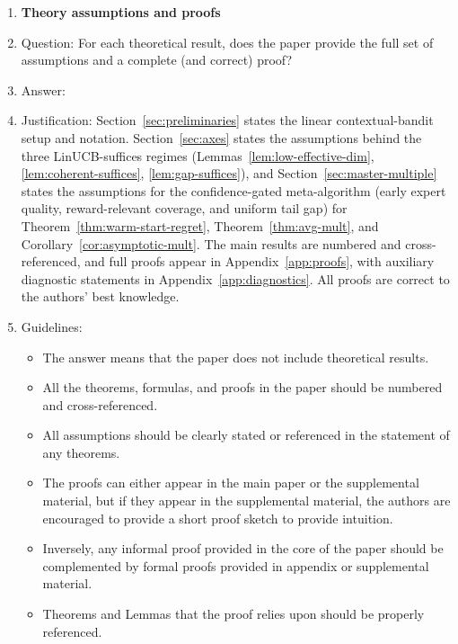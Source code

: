 \documentclass{article}
\theoremstyle{definition}
\theoremstyle{remark}
\theoremstyle{remark}
\begin{document}
\begin{enumerate}
\begin{itemize}
        \item While the authors might fear that complete honesty about limitations might be used by reviewers as grounds for rejection, a worse outcome might be that reviewers discover limitations that aren't acknowledged in the paper. The authors should use their best judgment and recognize that individual actions in favor of transparency play an important role in developing norms that preserve the integrity of the community. Reviewers will be specifically instructed to not penalize honesty concerning limitations.
    \end{itemize}

\item {\bf Theory assumptions and proofs}
    \item[] Question: For each theoretical result, does the paper provide the full set of assumptions and a complete (and correct) proof?
    \item[] Answer: \answerYes{} %
    \item[] Justification: Section~\ref{sec:preliminaries} states the linear contextual-bandit setup and notation. Section~\ref{sec:axes} states the assumptions behind the three LinUCB-suffices regimes (Lemmas~\ref{lem:low-effective-dim}, \ref{lem:coherent-suffices}, \ref{lem:gap-suffices}), and Section~\ref{sec:master-multiple} states the assumptions for the confidence-gated meta-algorithm (early expert quality, reward-relevant coverage, and uniform tail gap) for Theorem~\ref{thm:warm-start-regret}, Theorem~\ref{thm:avg-mult}, and Corollary~\ref{cor:asymptotic-mult}. The main results are numbered and cross-referenced, and full proofs appear in Appendix~\ref{app:proofs}, with auxiliary diagnostic statements in Appendix~\ref{app:diagnostics}. All proofs are correct to the authors' best knowledge.
    \item[] Guidelines:
    \begin{itemize}
        \item The answer \answerNA{} means that the paper does not include theoretical results. 
        \item All the theorems, formulas, and proofs in the paper should be numbered and cross-referenced.
        \item All assumptions should be clearly stated or referenced in the statement of any theorems.
        \item The proofs can either appear in the main paper or the supplemental material, but if they appear in the supplemental material, the authors are encouraged to provide a short proof sketch to provide intuition. 
        \item Inversely, any informal proof provided in the core of the paper should be complemented by formal proofs provided in appendix or supplemental material.
        \item Theorems and Lemmas that the proof relies upon should be properly referenced. 
    \end{itemize}


\end{enumerate}
\end{document}
